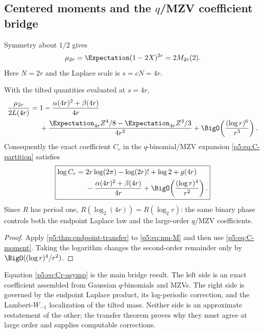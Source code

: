 \documentclass[11pt]{article}
\numberwithin{equation}{section}
\theoremstyle{definition}
\theoremstyle{remark}
\begin{document}
\subsection{Centered moments and the $q$/MZV coefficient bridge}

Symmetry about $1/2$ gives
\begin{equation}\label{p5:eq:mu-M}
 \mu_{2r}=\Expectation(1-2X)^{2r}=2M_{2r}(2).
\end{equation}
Here $N=2r$ and the Laplace scale is $s=cN=4r$.

\begin{corollary}\label{p5:cor:centered-moments}
With the tilted quantities evaluated at $s=4r$,
\begin{align}
 \frac{\mu_{2r}}{2L(4r)}={}&
 1-\frac{\alpha(4r)^2+\beta(4r)}{4r}\nonumber\\
 &+\frac{\Expectation_{4r}Z^4/8-\Expectation_{4r}Z^3/3}{4r^2}
 +\BigO\!\left(\frac{(\log r)^6}{r^3}\right).
 \label{p5:eq:mu-transfer}
\end{align}
Consequently the exact coefficient $C_r$ in the $q$-binomial/MZV expansion
\cref{p5:eq:C-partition} satisfies
\begin{equation}\label{p5:eq:Cr-asymp}
 \boxed{\begin{aligned}
 \log C_r={}&2r\log(2\pi)-\log(2r)!+\log2+g(4r)\\
 &-\frac{\alpha(4r)^2+\beta(4r)}{4r}
 +\BigO\!\left(\frac{(\log r)^4}{r^2}\right).
 \end{aligned}}
\end{equation}
Since $R$ has period one,
$R(\log_2(4r))=R(\log_2r)$: the same binary phase controls both the endpoint
Laplace law and the large-order $q$/MZV coefficients.
\end{corollary}

\begin{proof}
Apply \cref{p5:thm:endpoint-transfer} to \cref{p5:eq:mu-M} and then use
\cref{p5:eq:C-moment}.  Taking the logarithm changes the second-order remainder
only by $\BigO((\log r)^4/r^2)$.
\end{proof}

\begin{boxedremark}
Equation \cref{p5:eq:Cr-asymp} is the main bridge result.  The left side is an
exact coefficient assembled from Gaussian $q$-binomials and MZVs.  The right
side is governed by the endpoint Laplace product, its log-periodic correction,
and the Lambert-$W_{-1}$ localization of the tilted mass.  Neither side is an
approximate restatement of the other; the transfer theorem proves why they
must agree at large order and supplies computable corrections.
\end{boxedremark}
\end{document}

